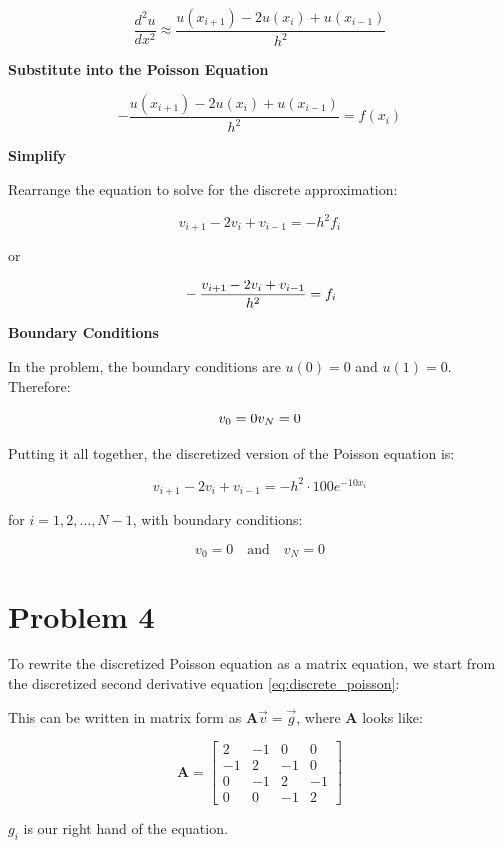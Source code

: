\documentclass[english,notitlepage]{revtex4-1}  %
\begin{document}
$$
    \frac{d^2 u}{dx^2} \approx \frac{u(x_{i+1}) - 2 u(x_i) + u(x_{i-1})}{h^2}
$$

\textbf{Substitute into the Poisson Equation}

$$
    -\frac{u(x_{i+1}) - 2 u(x_i) + u(x_{i-1})}{h^2} = f(x_i)
$$

\textbf{Simplify}

Rearrange the equation to solve for the discrete approximation:

$$
    v_{i+1} - 2 v_i + v_{i-1} = -h^2 f_i
$$

or

\begin{equation}{\label{eq:discrete_poisson}}
    -\frac{v_{i+1} - 2 v_i + v_{i-1}}{h^2} = f_i
\end{equation}

\textbf{Boundary Conditions}

In the problem, the boundary conditions are $u(0) = 0$ and $u(1) = 0$. Therefore:

$$
    v_0 = 0 \\v_N = 0
$$

Putting it all together, the discretized version of the Poisson equation is:

$$
    v_{i+1} - 2 v_i + v_{i-1} = -h^2 \cdot 100 e^{-10 x_i}
$$

for $i = 1, 2, \ldots, N-1$, with boundary conditions:

$$
    v_0 = 0 \quad \text{and} \quad v_N = 0
$$

\section*{Problem 4}
To rewrite the discretized Poisson equation as a matrix equation,
we start from the discretized second derivative equation \ref{eq:discrete_poisson}:

This can be written in matrix form as $\mathbf{A} \vec{v} = \vec{g}$, where  $\mathbf{A}$ looks like:

$$
    \mathbf{A} = \begin{bmatrix}
        2  & -1 & 0  & 0  \\
        -1 & 2  & -1 & 0  \\
        0  & -1 & 2  & -1 \\
        0  & 0  & -1 & 2
    \end{bmatrix}
$$

$g_i$ is our right hand of the equation.
\end{document}
